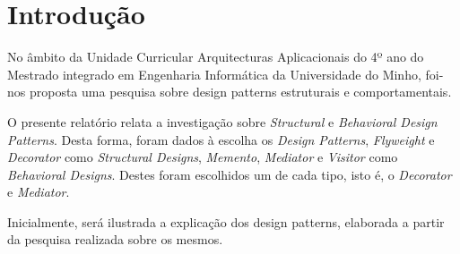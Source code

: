 \section{Introdução}
\label{sec:introducao}

\hspace{3mm} No âmbito da Unidade Curricular Arquitecturas Aplicacionais do 4º ano do Mestrado integrado em Engenharia Informática da Universidade do Minho, foi-nos proposta uma pesquisa sobre design patterns estruturais e comportamentais.

O presente relatório relata a investigação sobre \textit{Structural} e \textit{Behavioral Design Patterns}. Desta forma, foram dados à escolha os \textit{Design Patterns}, \textit{Flyweight} e \textit{Decorator} como \textit{Structural Designs}, \textit{Memento}, \textit{Mediator} e \textit{Visitor} como \textit{Behavioral Designs}. Destes foram escolhidos um de cada tipo, isto é, o \textit{Decorator} e \textit{Mediator}.

Inicialmente, será ilustrada a explicação dos design patterns, elaborada a partir da pesquisa realizada sobre os mesmos. 